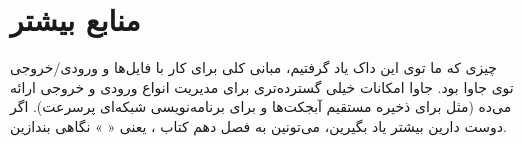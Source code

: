 \section{منابع بیشتر}

چیزی که ما توی این داک یاد گرفتیم، مبانی کلی برای کار با فایل‌ها و
ورودی/خروجی  توی جاوا بود. جاوا امکانات خیلی گسترده‌‌تری برای
مدیریت انواع ورودی و خروجی ارائه می‌ده (مثل
 برای ذخیره مستقیم آبجکت‌ها و 
برای برنامه‌نویسی شبکه‌ای پرسرعت). اگر دوست دارین بیشتر یاد بگیرین،
می‌تونین به فصل دهم کتاب  ، یعنی «
 » نگاهی بندازین.
	
	
	
	
